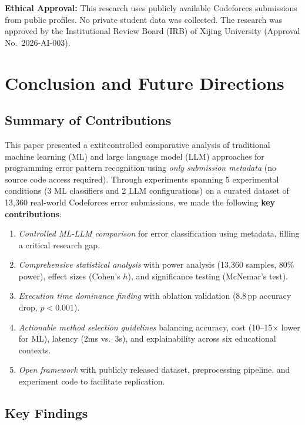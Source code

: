 \documentclass[acmsmall]{acmart}
\begin{document}
\textbf{Ethical Approval:} This research uses publicly available Codeforces
submissions from public profiles. No private student data was collected.
The research was approved by the Institutional Review Board (IRB) of
Xijing University (Approval No.~2026-AI-003).

\section{Conclusion and Future Directions}

\subsection*{Summary of Contributions}
This paper presented a 	extit{controlled comparative analysis} of
traditional machine learning (ML) and large language model (LLM) approaches
for programming error pattern recognition using \textit{only submission
metadata} (no source code access required). Through experiments spanning 5
experimental conditions (3 ML classifiers and 2 LLM configurations) on a curated dataset of
13,360 real-world Codeforces error submissions, we made the following
\textbf{key contributions}:

\begin{enumerate}
    \item \textit{Controlled ML-LLM comparison} for error classification using
          metadata, filling a critical research gap.
    \item \textit{Comprehensive statistical analysis} with power analysis
          (13,360 samples, 80\% power), effect sizes (Cohen's $h$), and
          significance testing (McNemar's test).
    \item \textit{Execution time dominance finding} with ablation validation
          (8.8\,pp accuracy drop, $p < 0.001$).
    \item \textit{Actionable method selection guidelines} balancing accuracy,
          cost (10--15$\times$ lower for ML), latency (2ms vs.\ 3s), and
          explainability across six educational contexts.
    \item \textit{Open framework} with publicly released dataset, preprocessing
          pipeline, and experiment code to facilitate replication.
\end{enumerate}

\subsection*{Key Findings}
\end{document}
